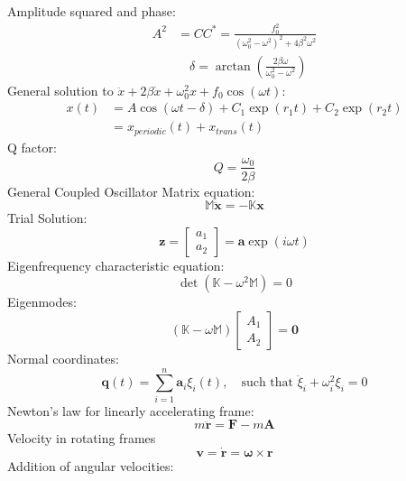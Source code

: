 \documentclass{article}
\renewcommand{\v}[1]{\ensuremath{\mathbf{#1}}} %
\renewcommand{\=}[1]{\stackrel{#1}{=}} %
\providecommand{\MM}{\mathbb{M}}
\providecommand{\KK}{\mathbb{K}}
\newcommand\m[1]{\begin{bmatrix}#1\end{bmatrix}}
\begin{document}
\begin{multicols}{4}
		Amplitude squared and phase:
		\begin{equation}
			\begin{split}
				A^2 &= CC^* = \frac{f_0^2}{(\omega_0^2 - \omega^2)^2 + 4\beta^2\omega^2} \\
				&\quad \delta = \arctan(\frac{2\beta \omega}{\omega_0^2 - \omega^2})
			\end{split}
		\end{equation}
		General solution to $\ddot{x} + 2\beta\dot{x} + \omega_0^2x + f_0\cos(\omega t)$:
		\begin{equation}
			\begin{split}
				x(t) &= A\cos(\omega t - \delta) + C_1\exp(r_1 t) + C_2\exp(r_2t) \\
				&= x_{periodic}(t) + x_{trans}(t)
			\end{split}
		\end{equation}
		Q factor:
		\begin{equation}
			Q = \frac{\omega_0}{2\beta}
		\end{equation}
		General Coupled Oscillator Matrix equation:
		\begin{equation}
			\MM\ddot{\v{x}} = -\KK\v{x}
		\end{equation}
		Trial Solution:
		\begin{equation}
			\v{z}=\m{a_1 \\a_2}=\v{a}\exp(i\omega t)
		\end{equation}
		Eigenfrequency characteristic equation:
		\begin{equation}
			\det(\KK - \omega^2\MM) = 0
		\end{equation}
		Eigenmodes:
		\begin{equation}
			(\KK - \omega\MM)\m{A_1 \\A_2} = \v{0}
		\end{equation}
		Normal coordinates:
		\begin{equation}
			\v{q}(t) = \sum_{i=1}^n\v{a}_i\xi_i(t), \quad \text{such that } \ddot{\xi}_i + \omega_i^2\xi_i = 0
		\end{equation}
		Newton's law for linearly accelerating frame:
		\begin{equation}
			m\ddot{\v{r}} = \v{F} - m\v{A}
		\end{equation}
		Velocity in rotating frames
		\begin{equation}
			\v{v} = \dot{\v{r}} = \bm{\omega} \times \v{r}
		\end{equation}
		Addition of angular velocities:
		\begin{equation}

\end{equation}
\end{multicols}
\end{document}
